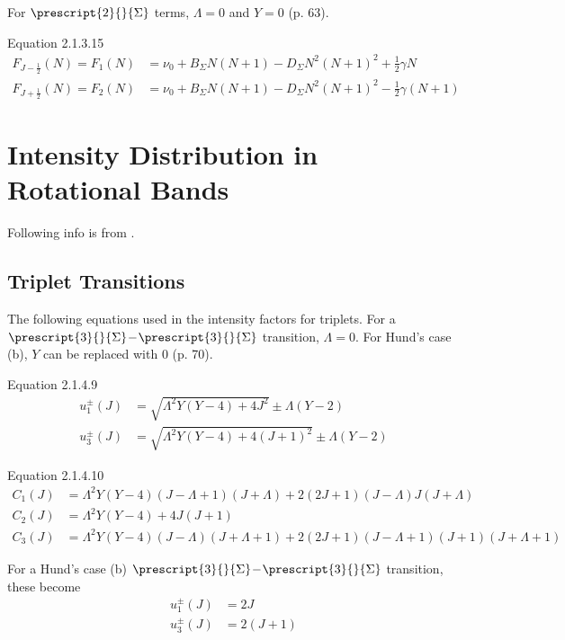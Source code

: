 \documentclass[11pt, twoside, fleqn]{report}
\newcommand{\dash}{\!-\!}
\newcommand{\state}[2]{\prescript{#1}{}{#2}}
\begin{document}
For $\state{2}{\Sigma}$ terms, $\Lambda = 0$ and $Y = 0$ (p. 63).

Equation 2.1.3.15
\begin{align*}
    F_{J - \tfrac{1}{2}}(N) = F_1(N) & = \nu_0 + B_\Sigma N(N + 1) - D_\Sigma N^2(N + 1)^2 + \tfrac{1}{2}\gamma N      \\
    F_{J + \tfrac{1}{2}}(N) = F_2(N) & = \nu_0 + B_\Sigma N(N + 1) - D_\Sigma N^2(N + 1)^2 - \tfrac{1}{2}\gamma(N + 1)
\end{align*}

\chapter{Intensity Distribution in Rotational Bands}

Following info is from \cite{kovacsRotationalStructureSpectra1969}.

\section{Triplet Transitions}

The following equations used in the intensity factors for triplets. For a $\state{3}{\Sigma}\dash\state{3}{\Sigma}$ transition, $\Lambda = 0$. For Hund's case (b), $Y$ can be replaced with $0$ (p. 70).

Equation 2.1.4.9
\begin{align*}
    u_1^{\pm}(J) & = \sqrt{\Lambda^2Y(Y - 4) + 4J^2} \pm \Lambda(Y - 2)       \\
    u_3^{\pm}(J) & = \sqrt{\Lambda^2Y(Y - 4) + 4(J + 1)^2} \pm \Lambda(Y - 2)
\end{align*}

Equation 2.1.4.10
\begin{align*}
    C_1(J) & = \Lambda^2Y(Y - 4)(J - \Lambda + 1)(J + \Lambda) + 2(2J + 1)(J - \Lambda)J(J + \Lambda)               \\
    C_2(J) & = \Lambda^2Y(Y - 4) + 4J(J + 1)                                                                        \\
    C_3(J) & = \Lambda^2Y(Y - 4)(J - \Lambda)(J + \Lambda + 1) + 2(2J + 1)(J - \Lambda + 1)(J + 1)(J + \Lambda + 1)
\end{align*}

For a Hund's case (b) $\state{3}{\Sigma}\dash\state{3}{\Sigma}$ transition, these become
\begin{align*}
    u_1^{\pm}(J) & = 2J       \\
    u_3^{\pm}(J) & = 2(J + 1)
\end{align*}
\end{document}
